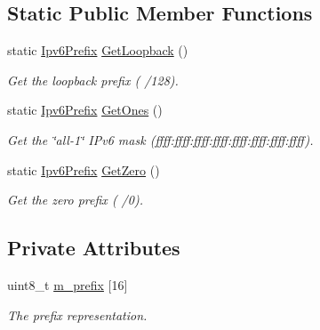 \subsection*{Static Public Member Functions}
\begin{DoxyCompactItemize}
\item 
static \hyperlink{classns3_1_1Ipv6Prefix}{Ipv6\+Prefix} \hyperlink{classns3_1_1Ipv6Prefix_a3c133e93cba14afb00338a00835fef84}{Get\+Loopback} ()
\begin{DoxyCompactList}\small\item\em Get the loopback prefix ( /128). \end{DoxyCompactList}\item 
static \hyperlink{classns3_1_1Ipv6Prefix}{Ipv6\+Prefix} \hyperlink{classns3_1_1Ipv6Prefix_aca3fd63a4e0973c7aabeee518d2777f2}{Get\+Ones} ()
\begin{DoxyCompactList}\small\item\em Get the \char`\"{}all-\/1\char`\"{} I\+Pv6 mask (ffff\+:ffff\+:ffff\+:ffff\+:ffff\+:ffff\+:ffff\+:ffff). \end{DoxyCompactList}\item 
static \hyperlink{classns3_1_1Ipv6Prefix}{Ipv6\+Prefix} \hyperlink{classns3_1_1Ipv6Prefix_ab32d2dbadcd8fa048ff296cb0a0e34ff}{Get\+Zero} ()
\begin{DoxyCompactList}\small\item\em Get the zero prefix ( /0). \end{DoxyCompactList}\end{DoxyCompactItemize}
\subsection*{Private Attributes}
\begin{DoxyCompactItemize}
\item 
uint8\+\_\+t \hyperlink{classns3_1_1Ipv6Prefix_a57fe096b66e6bc4330a195e0a2aa2407}{m\+\_\+prefix} \mbox{[}16\mbox{]}
\begin{DoxyCompactList}\small\item\em The prefix representation. \end{DoxyCompactList}\end{DoxyCompactItemize}
